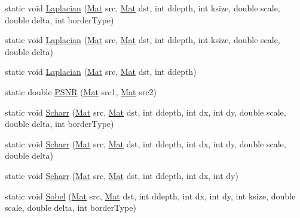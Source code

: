 \begin{DoxyCompactItemize}
\item 
static void \mbox{\hyperlink{classorg_1_1opencv_1_1imgproc_1_1_imgproc_add62d4b55bc4e7cc4faca4a77f6d3f94}{Laplacian}} (\mbox{\hyperlink{classorg_1_1opencv_1_1core_1_1_mat}{Mat}} src, \mbox{\hyperlink{classorg_1_1opencv_1_1core_1_1_mat}{Mat}} dst, int ddepth, int ksize, double scale, double delta, int border\+Type)
\item 
static void \mbox{\hyperlink{classorg_1_1opencv_1_1imgproc_1_1_imgproc_a8a0b5f6b5d9d7519bb45c57460d697e7}{Laplacian}} (\mbox{\hyperlink{classorg_1_1opencv_1_1core_1_1_mat}{Mat}} src, \mbox{\hyperlink{classorg_1_1opencv_1_1core_1_1_mat}{Mat}} dst, int ddepth, int ksize, double scale, double delta)
\item 
static void \mbox{\hyperlink{classorg_1_1opencv_1_1imgproc_1_1_imgproc_a69fc2b48c9e0b1e656c2320ed76b808a}{Laplacian}} (\mbox{\hyperlink{classorg_1_1opencv_1_1core_1_1_mat}{Mat}} src, \mbox{\hyperlink{classorg_1_1opencv_1_1core_1_1_mat}{Mat}} dst, int ddepth)
\item 
static double \mbox{\hyperlink{classorg_1_1opencv_1_1imgproc_1_1_imgproc_ab8ba2ea90f6c3696be6e21a9c2da2a22}{P\+S\+NR}} (\mbox{\hyperlink{classorg_1_1opencv_1_1core_1_1_mat}{Mat}} src1, \mbox{\hyperlink{classorg_1_1opencv_1_1core_1_1_mat}{Mat}} src2)
\item 
static void \mbox{\hyperlink{classorg_1_1opencv_1_1imgproc_1_1_imgproc_a94c9e2fdd65ecd76ae9135e33cfb9a99}{Scharr}} (\mbox{\hyperlink{classorg_1_1opencv_1_1core_1_1_mat}{Mat}} src, \mbox{\hyperlink{classorg_1_1opencv_1_1core_1_1_mat}{Mat}} dst, int ddepth, int dx, int dy, double scale, double delta, int border\+Type)
\item 
static void \mbox{\hyperlink{classorg_1_1opencv_1_1imgproc_1_1_imgproc_a6f27ca323b9ddb24d2b74ac4e106ea53}{Scharr}} (\mbox{\hyperlink{classorg_1_1opencv_1_1core_1_1_mat}{Mat}} src, \mbox{\hyperlink{classorg_1_1opencv_1_1core_1_1_mat}{Mat}} dst, int ddepth, int dx, int dy, double scale, double delta)
\item 
static void \mbox{\hyperlink{classorg_1_1opencv_1_1imgproc_1_1_imgproc_ac86859d311e2cb092dd9cddcfb20d900}{Scharr}} (\mbox{\hyperlink{classorg_1_1opencv_1_1core_1_1_mat}{Mat}} src, \mbox{\hyperlink{classorg_1_1opencv_1_1core_1_1_mat}{Mat}} dst, int ddepth, int dx, int dy)
\item 
static void \mbox{\hyperlink{classorg_1_1opencv_1_1imgproc_1_1_imgproc_a85a8cac062c05efeecf99de50f3ab8d7}{Sobel}} (\mbox{\hyperlink{classorg_1_1opencv_1_1core_1_1_mat}{Mat}} src, \mbox{\hyperlink{classorg_1_1opencv_1_1core_1_1_mat}{Mat}} dst, int ddepth, int dx, int dy, int ksize, double scale, double delta, int border\+Type)

\end{DoxyCompactItemize}
